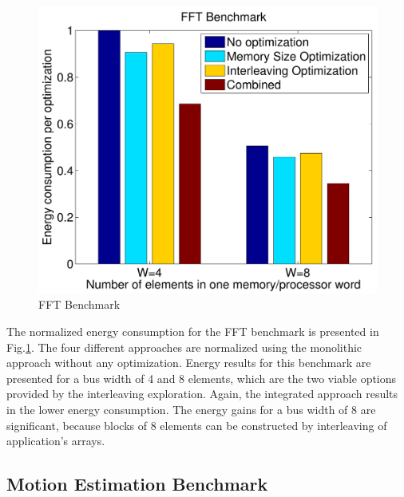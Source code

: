 \begin{figure}
\centering
	\includegraphics[scale = 0.5]{D/Images/fft.pdf} 
	\caption{FFT Benchmark}
	\label{fig:fft}
\end{figure}

The normalized energy consumption for the FFT benchmark is presented in Fig.\ref{fig:fft}.
The four different approaches are normalized using the monolithic approach without any optimization.
Energy results for this benchmark are presented for a bus width of 4 and 8 elements, which are the two viable options provided by the interleaving exploration.
Again, the integrated approach results in the lower energy consumption.
The energy gains for a bus width of 8 are significant, because blocks of 8 elements can be constructed by interleaving of application's arrays.

\subsection{Motion Estimation Benchmark}

